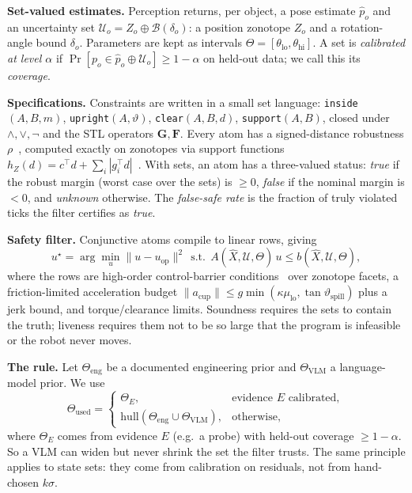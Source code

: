 \documentclass[10pt,twocolumn,letterpaper]{article}
\begin{document}
\textbf{Set-valued estimates.} Perception returns, per object, a pose estimate $\hat p_o$ and an uncertainty set
$\mathcal{U}_o=Z_o\oplus\mathcal{B}(\delta_o)$: a position zonotope $Z_o$ and a rotation-angle bound $\delta_o$. Parameters are kept as
intervals $\Theta=[\theta_{\mathrm{lo}},\theta_{\mathrm{hi}}]$. A set is \emph{calibrated at level $\alpha$} if
$\Pr[p_o\in\hat p_o\oplus\mathcal{U}_o]\ge1-\alpha$ on held-out data; we call this its \emph{coverage}.

\textbf{Specifications.} Constraints are written in a small set language: \texttt{inside}$(A,B,m)$, \texttt{upright}$(A,\vartheta)$,
\texttt{clear}$(A,B,d)$, \texttt{support}$(A,B)$, closed under $\wedge,\vee,\neg$ and the STL operators $\mathbf{G},\mathbf{F}$. Every atom has
a signed-distance robustness $\rho$~\cite{donze2010}, computed exactly on zonotopes via support functions
$h_Z(d)=c^\top d+\sum_i|g_i^\top d|$~\cite{girard2005,althoff2015}. With sets, an atom has a three-valued status:
\emph{true} if the robust margin (worst case over the sets) is $\ge0$, \emph{false} if the nominal margin is $<0$, and \emph{unknown} otherwise.
The \emph{false-safe rate} is the fraction of truly violated ticks the filter certifies as \emph{true}.

\textbf{Safety filter.} Conjunctive atoms compile to linear rows, giving
\begin{equation}
u^\star=\arg\min_u \|u-u_{\mathrm{op}}\|^2 \ \ \text{s.t.}\ \ A(\hat X,\mathcal{U},\Theta)\,u\le b(\hat X,\mathcal{U},\Theta),
\end{equation}
where the rows are high-order control-barrier conditions~\cite{ames2019} over zonotope facets, a friction-limited acceleration budget
$\|a_{\mathrm{cup}}\|\le g\min(\kappa\mu_{\mathrm{lo}},\tan\vartheta_{\mathrm{spill}})$ plus a jerk bound, and torque/clearance limits.
Soundness requires the sets to contain the truth; liveness requires them not to be so large that the program is infeasible or the robot
never moves.

\textbf{The rule.} Let $\Theta_{\mathrm{eng}}$ be a documented engineering prior and $\Theta_{\mathrm{VLM}}$ a language-model prior. We use
\begin{equation}
\Theta_{\mathrm{used}}=\begin{cases}\Theta_E, & \text{evidence }E\text{ calibrated},\\
\mathrm{hull}(\Theta_{\mathrm{eng}}\cup\Theta_{\mathrm{VLM}}), & \text{otherwise,}\end{cases}
\end{equation}
where $\Theta_E$ comes from evidence $E$ (e.g.\ a probe) with held-out coverage $\ge1-\alpha$. So a VLM can widen but never shrink the set the filter trusts. The same principle applies to state sets: they come from calibration on
residuals, not from hand-chosen $k\sigma$.
\end{document}

